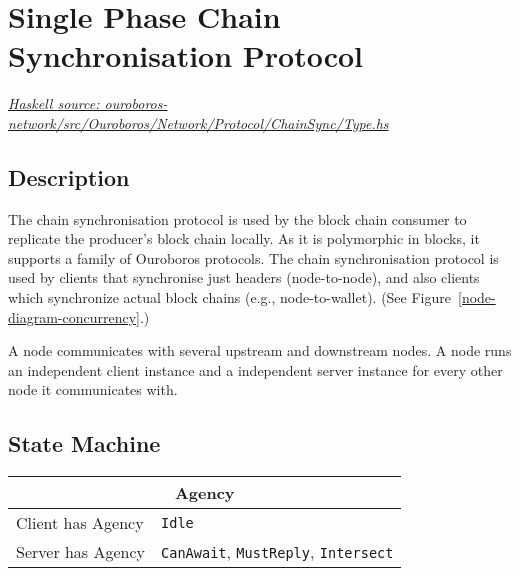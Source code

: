 \documentclass{report}
\newcommand{\hsref}[1]{\href{https://github.com/input-output-hk/ouroboros-network/blob/master/#1}{\emph{Haskell source: #1}}}
\newcommand{\state}[1]{\texttt{#1}}
\newcommand{\msg}[1]{\texttt{#1}}
\newcommand{\Idle}{\state{Idle}}
\theoremstyle{definition}{
  \newtheorem{lemma}{Lemma}[section] %
  \newtheorem{definition}[lemma]{Definition}
}
\theoremstyle{theorem}{
  \newtheorem{invariant}[lemma]{Invariant}
  \newtheorem{proofobligation}[lemma]{Proof Obligation}
}
\numberwithin{equation}{lemma}
\begin{document}
\section{Single Phase Chain Synchronisation Protocol}
\label{chain-sync-protocol}
\hsref{ouroboros-network/src/Ouroboros/Network/Protocol/ChainSync/Type.hs}
\newcommand{\CanAwait}{\state{CanAwait}}
\newcommand{\MustReply}{\state{MustReply}}
\newcommand{\Intersect}{\state{Intersect}}
\newcommand{\RequestNext}{\msg{RequestNext}}
\newcommand{\AwaitReply}{\msg{AwaitReply}}
\newcommand{\RollForward}{\msg{RollForward}}
\newcommand{\RollBackward}{\msg{RollBackward}}
\newcommand{\FindIntersect}{\msg{FindIntersect}}
\newcommand{\IntersectImproved}{\msg{IntersectImproved}}
\newcommand{\IntersectUnchanged}{\msg{IntersectUnchanged}}

\subsection{Description}
The chain synchronisation protocol is used by the block chain consumer
to replicate the producer's block chain locally. As it is polymorphic in blocks,
it supports a family of Ouroboros protocols.
The chain synchronisation protocol is used by clients that synchronise just headers (node-to-node),
and also clients which synchronize actual block chains (e.g., node-to-wallet).
(See Figure~\ref{node-diagram-concurrency}.)

A node communicates with several upstream and downstream nodes.
A node runs an independent client instance and a independent server instance for every
other node it communicates with.

\subsection{State Machine}

\begin{tabular}{|l|l|}
  \hline
  \multicolumn{2}{|c|}{Agency} \\ \hline
  Client has Agency & \Idle \\  \hline
  Server has Agency & \CanAwait, \MustReply, \Intersect \\ \hline
\end{tabular}
\end{document}
